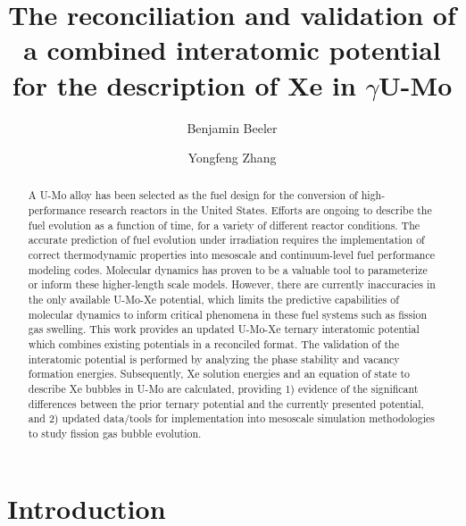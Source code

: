 \documentclass[review]{elsarticle}
\begin{document}
\begin{frontmatter}
\title{The reconciliation and validation of a combined interatomic potential for the description of Xe in $\gamma$U-Mo}

\author[ncsu,inl]{Benjamin Beeler}
\author[inl,uw]{Yongfeng Zhang}
\address[ncsu]{North Carolina State University, Raleigh, NC 27607}
\address[inl]{Idaho National Laboratory, Idaho Falls, ID 83415}
\address[uw]{Department of Engineering Physics, University of Wisconsin-Madison, Madison, WI 53706 }

\begin{abstract}

A U-Mo alloy has been selected as the fuel design for the conversion of high-performance research reactors in the United States. Efforts are ongoing to describe the fuel evolution as a function of time, for a variety of different reactor conditions. The accurate prediction of fuel evolution under irradiation requires the implementation of correct thermodynamic properties into mesoscale and continuum-level fuel performance modeling codes. Molecular dynamics has proven to be a valuable tool to parameterize or inform these higher-length scale models. However, there are currently inaccuracies in the only available U-Mo-Xe potential, which limits the predictive capabilities of molecular dynamics to inform critical phenomena in these fuel systems such as fission gas swelling. This work provides an updated U-Mo-Xe ternary interatomic potential which combines existing potentials in a reconciled format. The validation of the interatomic potential is performed by analyzing the phase stability and vacancy formation energies. Subsequently, Xe solution energies and an equation of state to describe Xe bubbles in U-Mo are calculated, providing 1) evidence of the significant differences between the prior ternary potential and the currently presented potential, and 2) updated data/tools for implementation into mesoscale simulation methodologies to study fission gas bubble evolution. 

\end{abstract}
\end{frontmatter}

\linenumbers
\modulolinenumbers[5]

\section{Introduction}
\end{document}

